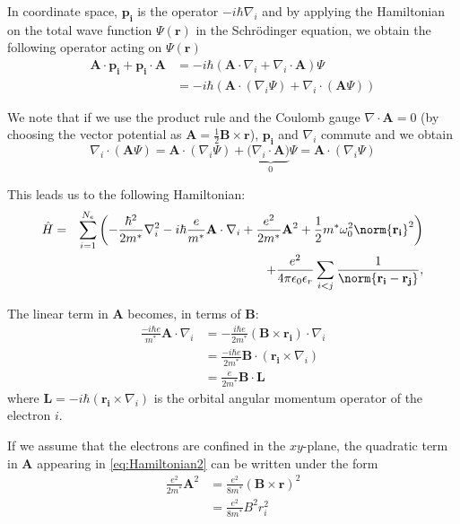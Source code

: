 In coordinate space, $\mathbf{p_i}$ is the operator $-i \hbar \nabla_i$ and by applying the Hamiltonian on the total wave function $\Psi(\mathbf{r})$ in the Schr\"odinger equation, we obtain the following operator acting on $\Psi(\mathbf{r})$
\begin{align}
\mathbf{A}\cdot \mathbf{p_i}+\mathbf{p_i}\cdot \mathbf{A} &= - i \hbar \left( \mathbf{A}\cdot \nabla_i+\nabla_i\cdot \mathbf{A} \right) \Psi \\
&=  - i \hbar \left( \mathbf{A}\cdot  ( \nabla_i \Psi)+\nabla_i\cdot (\mathbf{A} \Psi) \right) 
\end{align}

We note that if we use the product rule and the Coulomb gauge $\nabla \cdot \mathbf{A} = 0$ (by choosing the vector potential as $\mathbf{A} = \frac{1}{2} \mathbf{B} \times \mathbf{r}$), $\mathbf{p_i}$ and $\nabla_i$ commute and we obtain
\begin{equation}
 \nabla_i \cdot (\mathbf{A}\Psi) = \mathbf{A} \cdot (\nabla_i\Psi) + (\underbrace{\nabla_i \cdot \mathbf{A})}_0 \Psi=\mathbf{A} \cdot (\nabla_i\Psi) 
\end{equation}

This leads us to the following Hamiltonian:
\begin{align}
\label{eq:Hamiltonian2}
  \hat{H}&=&\sum_{i=1}^{N_e}\left(  -\frac{ \hbar^2}{2m^*} \nabla_i^2- i \hbar \frac{e}{m^*} \mathbf{A}\cdot \nabla_i + \frac{e^2}{2m^*}\mathbf{A}^2  + \frac{1}{2} m^* \omega_0^2 \norm{\mathbf{r_i}}^2  \right) \\
& &+ \frac{e^2}{4 \pi \epsilon_0 \epsilon_r} \sum_{i<j}\frac{1}{\norm{\mathbf{r_i}-\mathbf{r_j}}},
\end{align}

The linear term in $\mathbf{A}$ becomes, in terms of $\mathbf{B}$:
\begin{align}
\label{eq:linearTermA}
\frac{-i \hbar e}{m^*} \mathbf{A} \cdot \nabla_i &= -\frac{i \hbar e}{2m^*} (\mathbf{B} \times \mathbf{r_i}) \cdot \nabla_i \\
&= \frac{-i \hbar e}{2m^*} \mathbf{B} \cdot( \mathbf{r_i} \times \nabla_i)  \\
&= \frac{ e}{2m^*} \mathbf{B} \cdot \mathbf{L} 
\end{align}
where $\mathbf{L}=-i \hbar (\mathbf{r_i} \times \nabla_i)$ is the orbital angular momentum operator of the electron $i$.

If we assume that the electrons are confined in the $xy$-plane, the quadratic term in $\mathbf{A}$ appearing in \ref{eq:Hamiltonian2} can be written under the form
\begin{align}
\frac{e^2}{2m^*} \mathbf{A}^2 &= \frac{e^2}{8m^*} (\mathbf{B} \times \mathbf{r})^2 \\
&= \frac{e^2}{8m^*} B^2 r_i^2
\end{align}

